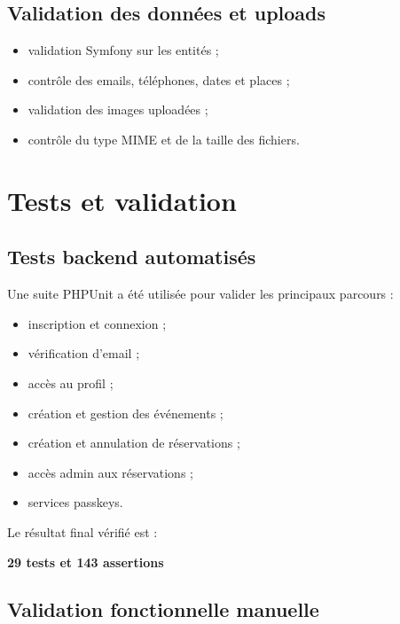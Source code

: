 \documentclass[12pt,a4paper]{report}
\begin{document}
\section{Validation des données et uploads}

\begin{itemize}[leftmargin=1.2cm]
    \item validation Symfony sur les entités ;
    \item contrôle des emails, téléphones, dates et places ;
    \item validation des images uploadées ;
    \item contrôle du type MIME et de la taille des fichiers.
\end{itemize}

\chapter{Tests et validation}

\section{Tests backend automatisés}

Une suite PHPUnit a été utilisée pour valider les principaux parcours :
\begin{itemize}[leftmargin=1.2cm]
    \item inscription et connexion ;
    \item vérification d'email ;
    \item accès au profil ;
    \item création et gestion des événements ;
    \item création et annulation de réservations ;
    \item accès admin aux réservations ;
    \item services passkeys.
\end{itemize}

Le résultat final vérifié est :
\begin{center}
    \textbf{29 tests et 143 assertions}
\end{center}

\section{Validation fonctionnelle manuelle}
\end{document}
